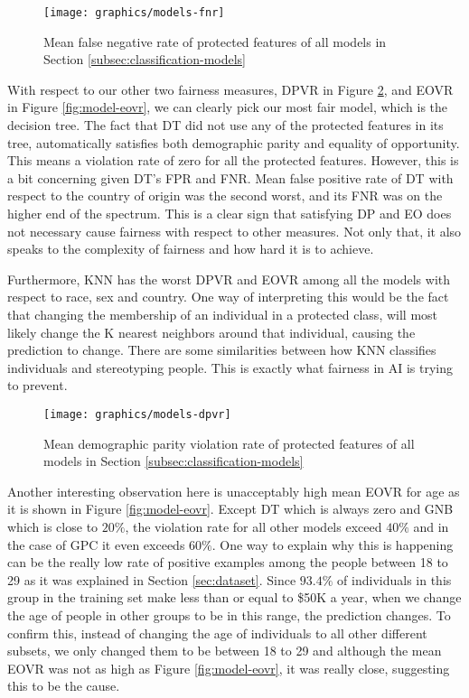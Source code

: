 \begin{figure}
	\begin{center}
    	\centering
        \texttt{[image: graphics/models-fnr]}
        \caption{Mean false negative rate of protected features of all models in Section \ref{subsec:classification-models}}
        \label{fig:model-fnr}
     \end{center}
\end{figure}

With respect to our other two fairness measures, DPVR in Figure \ref{fig:model-dpvr}, and EOVR in Figure \ref{fig:model-eovr}, we can clearly pick our most fair model, which is the decision tree. The fact that DT did not use any of the protected features in its tree, automatically satisfies both demographic parity and equality of opportunity. This means a violation rate of zero for all the protected features. However, this is a bit concerning given DT's FPR and FNR. Mean false positive rate of DT with respect to the country of origin was the second worst, and its FNR was on the higher end of the spectrum. This is a clear sign that satisfying DP and EO does not necessary cause fairness with respect to other measures. Not only that, it also speaks to the complexity of fairness and how hard it is to achieve.

Furthermore, KNN has the worst DPVR and EOVR among all the models with respect to race, sex and country. One way of interpreting this would be the fact that changing the membership of an individual in a protected class, will most likely change the K nearest neighbors around that individual, causing the prediction to change. There are some similarities between how KNN classifies individuals and stereotyping people. This is exactly what fairness in AI is trying to prevent.

\begin{figure}
	\begin{center}
    	\centering
        \texttt{[image: graphics/models-dpvr]}
        \caption{Mean demographic parity violation rate of protected features of all models in Section \ref{subsec:classification-models}}
        \label{fig:model-dpvr}
     \end{center}
\end{figure}

Another interesting observation here is unacceptably high mean EOVR for age as it is shown in Figure \ref{fig:model-eovr}.  Except DT which is always zero and GNB which is close to $20\%$, the violation rate for all other models exceed $40\%$ and in the case of GPC it even exceeds $60\%$. One way to explain why this is happening can be the really low rate of positive examples among the people between 18 to 29 as it was explained in Section \ref{sec:dataset}. Since $93.4\%$ of individuals in this group in the training set make less than or equal to \$50K a year, when we change the age of people in other groups to be in this range, the prediction changes. To confirm this, instead of changing the age of individuals to all other different subsets, we only changed them to be between 18 to 29 and although the mean EOVR was not as high as Figure \ref{fig:model-eovr}, it was really close, suggesting this to be the cause.

